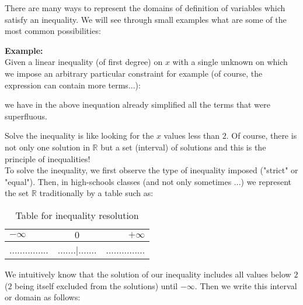 	There are many ways to represent the domains of definition of variables which satisfy an inequality. We will see through small examples what are some of the  most common possibilities:
	\begin{tcolorbox}[colframe=black,colback=white,sharp corners]
\textbf{{\Large {}}Example:}\\
	Given a linear inequality (of first degree) on $x$ with a single unknown on which we impose an arbitrary particular constraint for example (of course, the expression can contain more terms...):
	
	we have in the above inequation already simplified all the terms that were superfluous.
	
	Solve the inequality is like looking for the $x$ values less than $2$. Of course, there is not only one solution in $\mathbb{R}$ but a set (interval) of solutions and this is the principle of inequalities!\\
	
	To solve the inequality, we first observe the type of inequality imposed ("strict" or "equal"). Then, in high-schools classes (and not only sometimes ...) we represent the set $\mathbb{R}$ traditionally by a table such as:
	\begin{table}[H]
		\begin{center}
		\begin{tabular}{|l|c|r|}
		\hline 
		{\cellcolor{black!30}$-\infty$} & {\cellcolor{black!30}$0$} & {\cellcolor{black!30}$+\infty$}\\ 
		\hline 
		............... & .......|....... & ............... \\  
		\hline 
		\end{tabular} 
		\end{center}
		\caption{Table for inequality resolution}
	\end{table}
	We intuitively know that the solution of our inequality includes all values below $2$ ($2$ being itself excluded from the solutions) until $-\infty$. Then we write this interval or domain as follows:
	

\end{tcolorbox}
